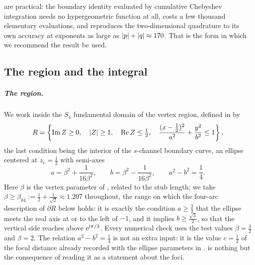  are practical: the boundary identity evaluated by cumulative Chebyshev
integration needs no hypergeometric function at all, costs a few thousand elementary evaluations,
and reproduces the two-dimensional quadrature to its own accuracy at exponents as large as
${|p|} + {|q|} \approx 170$.
That is the form in which we recommend the result be used.



\subsection{The region and the integral}
\label{jb:sec:setup}


\subparagraph{The region.}
We work inside the $S_4$ fundamental domain of the vertex region, defined in
\cite{Erbin:2023:SL2CQuarticVertex} by
\begin{equation}
  \label{jb:eq:region}
  R
    = \left \{ 
      \operatorname{Im} Z \ge 0,
      \quad
      {|Z|} \ge 1,
      \quad
      \operatorname{Re} Z \le \tfrac12,
      \quad
      \frac{(x - \tfrac12)^2}{a^2} + \frac{y^2}{b^2} \le 1
     \right \},
\end{equation}
the last condition being the interior of the $s$-channel boundary curve, an ellipse centered at
$z_c = \tfrac12$ with semi-axes
\begin{equation}
  \label{jb:eq:axes}
  a
    = \beta^2 + \frac{1}{16 \beta^2},
  \qquad
  b
    = \beta^2 - \frac{1}{16 \beta^2},
  \qquad
  a^2 - b^2
    = \frac14 .
\end{equation}
Here $\beta$ is the vertex parameter of \cite{Erbin:2023:SL2CQuarticVertex}, related to the stub
length; we take $\beta \ge \beta_{04} := \tfrac12 + \tfrac{1}{\sqrt2} \approx 1.207$ throughout,
the range on which the four-arc description of $\partial R$ below holds: it is exactly the
condition $a \ge \tfrac32$ that the ellipse meets the real axis at or to the left of $-1$, and it
implies $b \ge \tfrac{\sqrt3}{2}$, so that the vertical side reaches above $\mathrm{e}^{\mathrm{i} \pi/3}$.
Every numerical check uses the test values $\beta = \tfrac32$ and $\beta = 2$.
The relation $a^2 - b^2 = \tfrac14$ is not an extra input: it is the value $c = \tfrac12$ of the
focal distance already recorded with the ellipse parameters in
\cite{Erbin:2023:SL2CQuarticVertex}.
 is nothing but the consequence of reading it as a statement about the foci.

